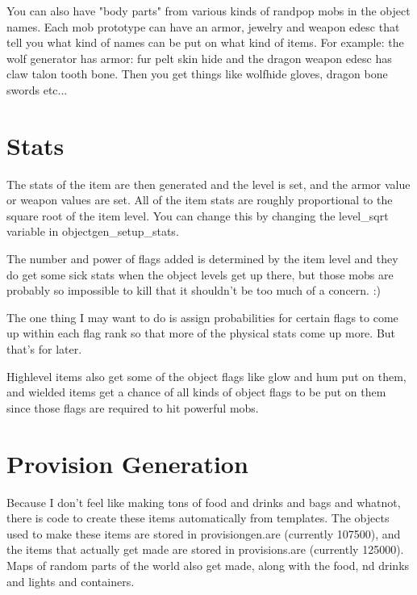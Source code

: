 You can also have "body parts" from various kinds of randpop mobs in the
object names. Each mob prototype can have an armor, jewelry and weapon edesc
that tell you what kind of names can be put on what kind of items. For
example: the wolf generator has armor: fur pelt skin hide and the dragon
weapon edesc has claw talon tooth bone. Then you get things like wolfhide
gloves, dragon bone swords etc...

\section{Stats}
The stats of the item are then generated and the level is set, and the
armor value or weapon values are set. All of the item stats are roughly
proportional to the square root of the item level. You can change this
by changing the level\_sqrt variable in objectgen\_setup\_stats.

The number and power of flags added is determined by the item level and
they do get some sick stats when the object levels get up there, but those
mobs are probably so impossible to kill that it shouldn't be too much of
a concern. :)

The one thing I may want to do is assign probabilities for certain flags
to come up within each flag rank so that more of the physical stats come
up more. But that's for later.


Highlevel items also get some of the object flags like glow and hum put on
them, and wielded items get a chance of all kinds of object flags to
be put on them since those flags are required to hit powerful mobs.


\section{Provision Generation}

Because I don't feel like making tons of food and drinks and bags and whatnot,
there is code to create these items automatically from templates. The objects
used to make these items are stored in provisiongen.are (currently 107500),
and the items that actually get made are stored in provisions.are (currently
125000). Maps of random parts of the world also get made, along with the food,
nd drinks and lights and containers.

